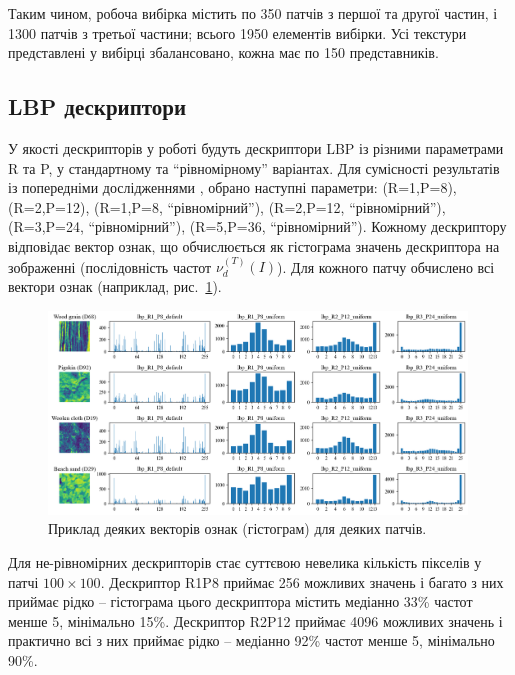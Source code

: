 Таким чином, робоча вибірка містить по 350 патчів з першої та другої частин, і 1300 патчів з третьої частини; всього 1950 елементів вибірки.
Усі текстури представлені у вибірці збалансовано, кожна має по 150 представників.

\subsection{LBP дескриптори}\label{section2.1b}\hfill

У якості дескрипторів у роботі будуть дескриптори LBP із різними параметрами R та P, у стандартному та ``рівномірному'' варіантах.
Для сумісності результатів із попередніми дослідженнями \cite{ojala2002,fastlbp2024}, обрано наступні параметри:
(R=1,P=8), (R=2,P=12), (R=1,P=8, ``рівномірний''), (R=2,P=12, ``рівномірний''), (R=3,P=24, ``рівномірний''), (R=5,P=36, ``рівномірний'').
Кожному дескриптору відповідає вектор ознак, що обчислюється як гістограма значень дескриптора на зображенні (послідовність частот $\nu^{(T)}_d(I)$).
Для кожного патчу обчислено всі вектори ознак (наприклад, рис.~\ref{fig:example-features}).

\begin{figure}[h]
    \centering
    \includegraphics[width=0.99\textwidth]{img/example_features.png}
    \caption{
        Приклад деяких векторів ознак (гістограм) для деяких патчів.
    }
    \label{fig:example-features}
\end{figure}

Для не-рівномірних дескрипторів стає суттєвою невелика кількість пікселів у патчі $100\times 100$.
Дескриптор R1P8 приймає 256 можливих значень і багато з них приймає рідко -- гістограма цього дескриптора містить медіанно 33\% частот менше 5, мінімально 15\%.
Дескриптор R2P12 приймає 4096 можливих значень і практично всі з них приймає рідко -- медіанно 92\% частот менше 5, мінімально 90\%.


